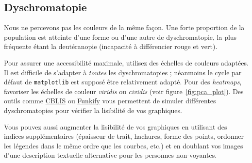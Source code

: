 

\subsection{Dyschromatopie}
Nous ne percevons pas les couleurs de la même façon. Une forte proportion de la population est atteinte d'une forme ou d'une autre de dyschromatopie, la plus fréquente étant la deutéranopie (incapacité à différencier rouge et vert). 

Pour assurer une accessibilité maximale, utilisez des échelles de couleurs
adaptées. Il est difficile de s'adapter à \textit{toutes} les dyschromatopies ;
néanmoins le cycle par défaut de \texttt{matplotlib} est supposé être
relativement adapté. Pour des \textit{heatmaps}, favoriser les échelles de
couleur \textit{viridis} ou \textit{cividis} (voir
figure~\ref{fig:pca_plot}). Des outils comme \href{https://www.color-blindness.com/coblis-color-blindness-simulator/}{CBLIS} ou \href{https://www.funkify.org}{Funkify} vous permettent de simuler différentes dyschromatopies pour vérifier la lisibilité de vos graphiques.

Vous pouvez aussi augmenter la lisibilité de vos graphiques en utilisant des
indices supplémentaires (épaisseur de trait, hachures, forme des points,
ordonner les légendes dans le même ordre que les courbes, etc.) et en doublant
vos images d'une description textuelle alternative pour les personnes
non-voyantes.


